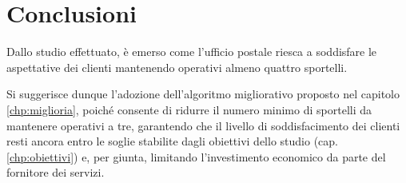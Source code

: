 \chapter{Conclusioni}
Dallo studio effettuato, è emerso come l'ufficio postale riesca a soddisfare le aspettative dei clienti mantenendo operativi almeno quattro sportelli.

Si suggerisce dunque l'adozione dell'algoritmo migliorativo proposto nel capitolo \ref{chp:miglioria}, poiché consente di ridurre il numero minimo di sportelli da mantenere operativi a tre, garantendo che il livello di soddisfacimento dei clienti resti ancora entro le soglie stabilite dagli obiettivi dello studio (cap. \ref{chp:obiettivi}) e, per giunta, limitando l'investimento economico da parte del fornitore dei servizi.